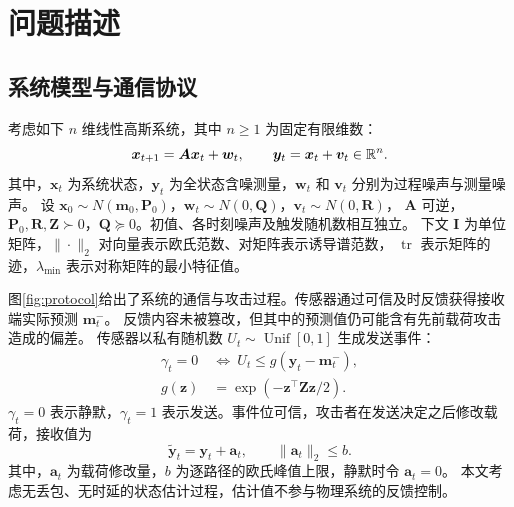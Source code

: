 \section{问题描述}
\label{sec:model}
\subsection{系统模型与通信协议}
考虑如下 $n$ 维线性高斯系统，其中 $n\ge1$ 为固定有限维数：
\begin{equation}
 {\bm{x}}_{t+1}={\bm{A}}{\bm{x}}_t+{\bm{w}}_t,\qquad {\bm{y}}_t={\bm{x}}_t+{\bm{v}}_t\in\mathbb R^n.
 \label{eq:model}
\end{equation}
其中，${\bm{x}}_t$ 为系统状态，${\bm{y}}_t$ 为全状态含噪测量，${\bm{w}}_t$ 和 ${\bm{v}}_t$ 分别为过程噪声与测量噪声。
设 ${\bm{x}}_0\sim N({\bm{m}}_0,{\bm{P}}_0)$，${\bm{w}}_t\sim N(0,{\bm{Q}})$，${\bm{v}}_t\sim N(0,{\bm{R}})$，
${\bm{A}}$ 可逆，${\bm{P}}_0,{\bm{R}},{\bm{Z}}\succ0$，${\bm{Q}}\succeq0$。初值、各时刻噪声及触发随机数相互独立。
下文 ${\bm{I}}$ 为单位矩阵，$\|\cdot\|_2$ 对向量表示欧氏范数、对矩阵表示诱导谱范数，
$\operatorname{tr}$ 表示矩阵的迹，$\lambda_{\min}$ 表示对称矩阵的最小特征值。

图\ref{fig:protocol}给出了系统的通信与攻击过程。传感器通过可信及时反馈获得接收端实际预测 ${\bm{m}}_t^-$。
反馈内容未被篡改，但其中的预测值仍可能含有先前载荷攻击造成的偏差。
传感器以私有随机数 $U_t\sim\operatorname{Unif}[0,1]$ 生成发送事件：
\begin{equation}
 \begin{aligned}
 \gamma_t=0\ &\Longleftrightarrow\ U_t\le g({\bm{y}}_t-{\bm{m}}_t^-),\\
 g({\bm{z}})&=\exp(-{\bm{z}}^\top {\bm{Z}}{\bm{z}}/2).
 \end{aligned}
 \label{eq:trigger}
\end{equation}
$\gamma_t=0$ 表示静默，$\gamma_t=1$ 表示发送。事件位可信，攻击者在发送决定之后修改载荷，接收值为
\begin{equation}
 \widetilde {\bm{y}}_t={\bm{y}}_t+{\bm{a}}_t,\qquad \|{\bm{a}}_t\|_2\le b.
 \label{eq:peak}
\end{equation}
其中，${\bm{a}}_t$ 为载荷修改量，$b$ 为逐路径的欧氏峰值上限，静默时令 ${\bm{a}}_t=0$。
本文考虑无丢包、无时延的状态估计过程，估计值不参与物理系统的反馈控制。



